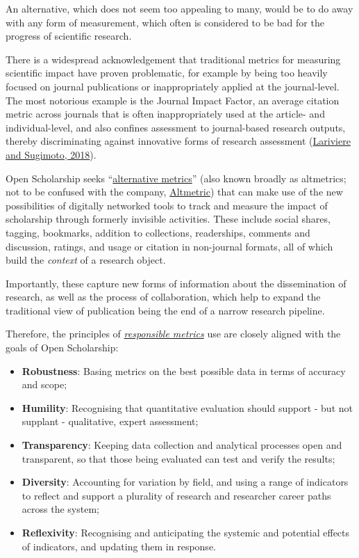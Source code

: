 An alternative, which does not seem too appealing to many, would be to
do away with any form of measurement, which often is considered to be
bad for the progress of scientific research.

There is a widespread acknowledgement that traditional metrics for
measuring scientific impact have proven problematic, for example by
being too heavily focused on journal publications or inappropriately
applied at the journal-level. The most notorious example is the Journal
Impact Factor, an average citation metric across journals that is often
inappropriately used at the article- and individual-level, and also
confines assessment to journal-based research outputs, thereby
discriminating against innovative forms of research assessment
(\href{https://arxiv.org/abs/1801.08992}{Lariviere and Sugimoto, 2018}).

Open Scholarship seeks
``\href{https://en.wikipedia.org/wiki/Altmetrics}{alternative metrics}''
(also known broadly as altmetrics; not to be confused with the company,
\href{https://www.altmetric.com/}{Altmetric}) that can make use of the
new possibilities of digitally networked tools to track and measure the
impact of scholarship through formerly invisible activities. These
include social shares, tagging, bookmarks, addition to collections,
readerships, comments and discussion, ratings, and usage or citation in
non-journal formats, all of which build the \emph{context} of a research
object.

Importantly, these capture new forms of information about the
dissemination of research, as well as the process of collaboration,
which help to expand the traditional view of publication being the end
of a narrow research pipeline.

Therefore, the principles of
\href{https://responsiblemetrics.org/}{\emph{responsible metrics}} use
are closely aligned with the goals of Open Scholarship:

\begin{itemize}
\item
  \textbf{Robustness}: Basing metrics on the best possible data in terms
  of accuracy and scope;
\item
  \textbf{Humility}: Recognising that quantitative evaluation should
  support - but not supplant - qualitative, expert assessment;
\item
  \textbf{Transparency}: Keeping data collection and analytical
  processes open and transparent, so that those being evaluated can test
  and verify the results;
\item
  \textbf{Diversity}: Accounting for variation by field, and using a
  range of indicators to reflect and support a plurality of research and
  researcher career paths across the system;
\item
  \textbf{Reflexivity}: Recognising and anticipating the systemic and
  potential effects of indicators, and updating them in response.
\end{itemize}

